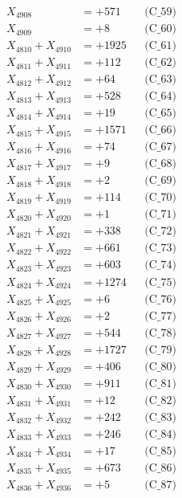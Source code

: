 \documentclass[a4paper,10pt]{article}
\begin{document}
{\begin{align}
X_{4908} &= +571 && \text{(C\_59)} \\
X_{4909} &= +8 && \text{(C\_60)} \\
\allowbreak
X_{4810} + X_{4910} &= +1925 && \text{(C\_61)} \\
X_{4811} + X_{4911} &= +112 && \text{(C\_62)} \\
X_{4812} + X_{4912} &= +64 && \text{(C\_63)} \\
X_{4813} + X_{4913} &= +528 && \text{(C\_64)} \\
X_{4814} + X_{4914} &= +19 && \text{(C\_65)} \\
\allowbreak
X_{4815} + X_{4915} &= +1571 && \text{(C\_66)} \\
X_{4816} + X_{4916} &= +74 && \text{(C\_67)} \\
X_{4817} + X_{4917} &= +9 && \text{(C\_68)} \\
X_{4818} + X_{4918} &= +2 && \text{(C\_69)} \\
X_{4819} + X_{4919} &= +114 && \text{(C\_70)} \\
\allowbreak
X_{4820} + X_{4920} &= +1 && \text{(C\_71)} \\
X_{4821} + X_{4921} &= +338 && \text{(C\_72)} \\
X_{4822} + X_{4922} &= +661 && \text{(C\_73)} \\
X_{4823} + X_{4923} &= +603 && \text{(C\_74)} \\
X_{4824} + X_{4924} &= +1274 && \text{(C\_75)} \\
\allowbreak
X_{4825} + X_{4925} &= +6 && \text{(C\_76)} \\
X_{4826} + X_{4926} &= +2 && \text{(C\_77)} \\
X_{4827} + X_{4927} &= +544 && \text{(C\_78)} \\
X_{4828} + X_{4928} &= +1727 && \text{(C\_79)} \\
X_{4829} + X_{4929} &= +406 && \text{(C\_80)} \\
\allowbreak
X_{4830} + X_{4930} &= +911 && \text{(C\_81)} \\
X_{4831} + X_{4931} &= +12 && \text{(C\_82)} \\
X_{4832} + X_{4932} &= +242 && \text{(C\_83)} \\
X_{4833} + X_{4933} &= +246 && \text{(C\_84)} \\
X_{4834} + X_{4934} &= +17 && \text{(C\_85)} \\
\allowbreak
X_{4835} + X_{4935} &= +673 && \text{(C\_86)} \\
X_{4836} + X_{4936} &= +5 && \text{(C\_87)} \\

\end{align}}
\end{document}
